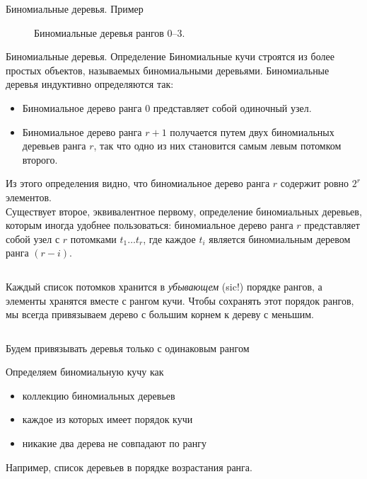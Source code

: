 \begin{frame}[fragile]{Биномиальные деревья. Пример}
\begin{figure}[h]
  \centering
  
  \caption{Биномиальные деревья рангов 0--3.}
  \label{fig:3.3}
\end{figure}


\end{frame}

\begin{frame}{Биномиальные деревья. Определение}
Биномиальные кучи строятся из более простых объектов, называемых
биномиальными деревьями. Биномиальные деревья индуктивно определяются
так:
\begin{itemize}
  \item Биномиальное дерево ранга 0 представляет собой одиночный узел.
  \item Биномиальное дерево ранга $r+1$ получается путем
   двух биномиальных деревьев ранга $r$, так
  что одно из них становится самым левым потомком второго.
\end{itemize}
Из этого определения видно, что биномиальное дерево ранга $r$ содержит
ровно $2^r$ элементов.  \\

Существует второе, эквивалентное первому,
определение биномиальных деревьев, которым иногда удобнее
пользоваться: биномиальное дерево ранга $r$ представляет собой узел
с $r$ потомками $t_1\ldots t_r$, где каждое $t_i$ является
биномиальным деревом ранга $(r-i)$.
\end{frame}




\begin{frame}[fragile]{}
\inputminted[firstline=5, lastline=5] {haskell}{code/BinomialHeap.lhs}

Каждый список потомков хранится в \emph{убывающем} (sic!) порядке рангов, а элементы
хранятся вместе с рангом кучи.  Чтобы сохранять этот порядок рангов, мы всегда
привязываем дерево с большим корнем к дереву с меньшим.

\inputminted[firstline=11, lastline=15] {haskell}{code/BinomialHeap.lhs}

Будем привязывать деревья только с одинаковым рангом
\end{frame}


\begin{frame}[fragile]{}
Определяем биномиальную кучу как 
\begin{itemize}
  \item коллекцию биномиальных деревьев
  \item каждое из которых имеет порядок кучи
  \item никакие два дерева не совпадают по рангу
\end{itemize} 

Например, список деревьев в порядке возрастания ранга.
\inputminted[firstline=6, lastline=6] {haskell}{code/BinomialHeap.lhs}
\end{frame}


